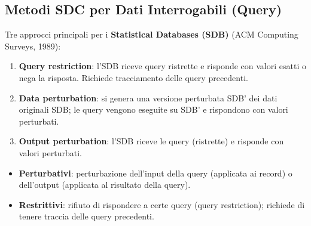 \documentclass[a4paper,11pt]{article}
\begin{document}
\subsection{Metodi SDC per Dati Interrogabili (Query)}

Tre approcci principali per i \textbf{Statistical Databases (SDB)} (ACM Computing Surveys, 1989):
\begin{enumerate}
  \item \textbf{Query restriction}: l'SDB riceve query ristrette e risponde con valori esatti o nega la risposta. Richiede tracciamento delle query precedenti.
  \item \textbf{Data perturbation}: si genera una versione perturbata SDB' dei dati originali SDB; le query vengono eseguite su SDB' e rispondono con valori perturbati.
  \item \textbf{Output perturbation}: l'SDB riceve le query (ristrette) e risponde con valori perturbati.
\end{enumerate}

\begin{itemize}
  \item \textbf{Perturbativi}: perturbazione dell'input della query (applicata ai record) o dell'output (applicata al risultato della query).
  \item \textbf{Restrittivi}: rifiuto di rispondere a certe query (query restriction); richiede di tenere traccia delle query precedenti.
\end{itemize}
\end{document}
